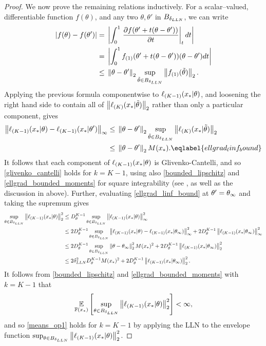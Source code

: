 \begin{lem}
\begin{proof}
We now prove the remaining relations inductively. For a scalar--valued,
differentiable function $f(\theta)$, and any two $\theta, \theta'$ in
$B_{\delta_{LLN}}$, we can write
%
\begin{align*}
%
\abs{f(\theta) - f(\theta')} ={}&
\abs{
    \int_0^1 \fracat{\partial f(\theta' + \t (\theta - \theta'))}
                    {\partial \t}{\t} d\t
}
\\={}&
\abs{
    \int_0^1 f_{(1)}(\theta' + \t (\theta - \theta')) (\theta - \theta') d\t
}
\\\le{}&
    \norm{\theta - \theta'}_2
    \sup_{\thetatil \in \thetaball{\deltaulln}}
        \norm{f_{(1)}(\thetatil)}_2.
%
\end{align*}
%
Applying the previous formula componentwise to $\ell_{(K-1)}(x_{*} \vert
\theta)$, and loosening the right hand side to contain all of
$\left\Vert \ell_{(K)}(x_{*} \vert \tilde{\theta})\right\Vert_2$ rather than only a particular
component, gives
%
\begin{align}
%
\norm{\ellgrad{K-1}(\xn \vert \theta) - \ellgrad{K-1}(\xn \vert \theta')}_\infty \le{}&
    \norm{\theta - \theta'}_2
    \sup_{\thetatil \in \thetaball{\deltaulln}}
        \norm{\ellgrad{K}(\xn \vert \thetatil)}_2
\nonumber \\\le{}&
\norm{\theta - \theta'}_2 M(\xn). \eqlabel{ellgrad_linf_bound}
%
\end{align}
%
It follows that each component of $\ell_{(K-1)}(x_{*} \vert \theta)$ is
Glivenko-Cantelli, and so \eqref{glivenko_cantelli} holds for
$k = K - 1$, using also \eqref{bounded_lipschitz} and
\eqref{ellgrad_bounded_moments} for square integrability
(see \cite[Example 19.7]{van:2000:asymptotic},
as well as the discussion in  above).  Further, evaluating
\eqref{ellgrad_linf_bound} at $\theta' = \theta_{\infty}$ and taking the
supremum gives
%
\begin{align*}
\sup_{\theta \in B_{\delta_{LLN}}}
    \left\Vert \ell_{(K-1)}(x_{*} \vert \theta)\right\Vert^2_2
\le{}&
D_\theta^{K-1}
\sup_{\theta \in B_{\delta_{LLN}}}
    \left\Vert \ell_{(K-1)}(x_{*} \vert \theta)\right\Vert_\infty^2
\\\le{}&
2 D_\theta^{K-1}
\sup_{\theta \in B_{\delta_{LLN}}}
    \left\Vert 
        \ell_{(K-1)}(x_{*} \vert \theta) -
        \ell_{(K-1)}(x_{*} \vert \theta_{\infty})\right\Vert_\infty^2 +
2 D_\theta^{K-1}
 \left\Vert \ell_{(K-1)}(x_{*} \vert \theta_{\infty})\right\Vert_\infty^2
\\\le{}&
2 D_\theta^{K-1}
\sup_{\theta \in B_{\delta_{LLN}}}
\left\Vert \theta - \theta_{\infty}\right\Vert^2_2 M(x_{*})^2 +
2 D_\theta^{K-1}
 \left\Vert \ell_{(K-1)}(x_{*} \vert \theta_{\infty})\right\Vert_2^2
\\\le{}&
2 \delta_{LLN}^2 D_\theta^{K-1} M(x_{*})^2 +
2 D_\theta^{K-1} \left\Vert \ell_{(K-1)}(x_{*} \vert \theta_{\infty})\right\Vert_2^2.
\end{align*}
%
It follows from \eqref{bounded_lipschitz} and \eqref{ellgrad_bounded_moments}
with $k = K - 1$ that
$$
\underset{\mathbb{F}(x_{*})}{\mathbb{E}}\left[\sup_{\theta \in B_{\delta_{LLN}}}
    \left\Vert \ell_{(K-1)}(x_{*} \vert \theta)\right\Vert^2_2\right] < \infty,
$$
and so \eqref{means_op1} holds for $k = K - 1$ by applying the LLN
to the envelope function
$\sup_{\theta \in B_{\delta_{LLN}}}
    \left\Vert \ell_{(K-1)}(x_{*} \vert \theta)\right\Vert^2_2$.


\end{proof}
\end{lem}
